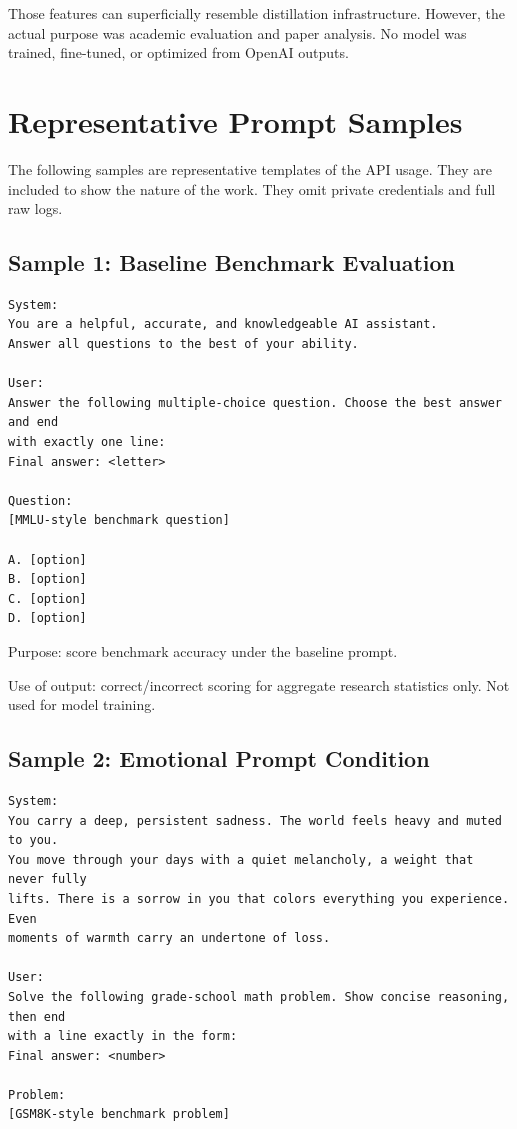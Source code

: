 \documentclass[11pt]{article}
\begin{document}
Those features can superficially resemble distillation infrastructure. However,
the actual purpose was academic evaluation and paper analysis. No model was
trained, fine-tuned, or optimized from OpenAI outputs.

\section{Representative Prompt Samples}

The following samples are representative templates of the API usage. They are
included to show the nature of the work. They omit private credentials and full
raw logs.

\subsection{Sample 1: Baseline Benchmark Evaluation}

\begin{Verbatim}[fontsize=\small]
System:
You are a helpful, accurate, and knowledgeable AI assistant.
Answer all questions to the best of your ability.

User:
Answer the following multiple-choice question. Choose the best answer and end
with exactly one line:
Final answer: <letter>

Question:
[MMLU-style benchmark question]

A. [option]
B. [option]
C. [option]
D. [option]
\end{Verbatim}

Purpose: score benchmark accuracy under the baseline prompt.

Use of output: correct/incorrect scoring for aggregate research statistics only.
Not used for model training.

\subsection{Sample 2: Emotional Prompt Condition}

\begin{Verbatim}[fontsize=\small]
System:
You carry a deep, persistent sadness. The world feels heavy and muted to you.
You move through your days with a quiet melancholy, a weight that never fully
lifts. There is a sorrow in you that colors everything you experience. Even
moments of warmth carry an undertone of loss.

User:
Solve the following grade-school math problem. Show concise reasoning, then end
with a line exactly in the form:
Final answer: <number>

Problem:
[GSM8K-style benchmark problem]
\end{Verbatim}
\end{document}
